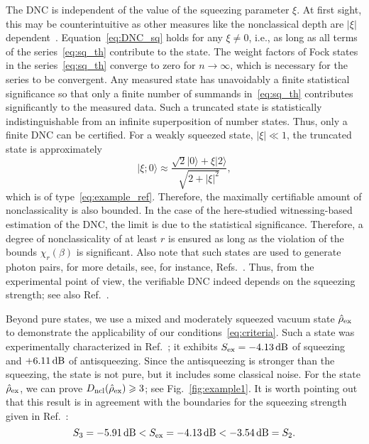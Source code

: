 \documentclass[aps,pra,twocolumn,showpacs,superscriptaddress,10pt]{revtex4-1}
\begin{document}
	The DNC is independent of the value of the squeezing parameter $\xi$.
	At first sight, this may be counterintuitive as other measures like the nonclassical depth are $|\xi|$ dependent~\cite{Lee1991}.
	Equation~\eqref{eq:DNC_sq} holds for any $\xi\neq0$, i.e., as long as all terms of the series~\eqref{eq:sq_th} contribute to the state.
	The weight factors of Fock states in the series~\eqref{eq:sq_th} converge to zero for $n\to\infty$, which is necessary for the series to be convergent.
	Any measured state has unavoidably a finite statistical significance so that only a finite number of summands in~\eqref{eq:sq_th} contributes significantly to the measured data.
	Such a truncated state is statistically indistinguishable from an infinite superposition of number states.
	Thus, only a finite DNC can be certified.
	For a weakly squeezed state, $|\xi|\ll1$, the truncated state is approximately 
	\begin{equation}\label{eq:sq_approx}
		|\xi;0\rangle\approx\frac{\sqrt{2}|0\rangle+\xi|2\rangle}{\sqrt{2+|\xi|^2}},
	\end{equation}
	which is of type~\eqref{eq:example_ref}.
	Therefore, the maximally certifiable amount of nonclassicality is also bounded.
	In the case of the here-studied witnessing-based estimation of the DNC, the limit is due to the statistical significance.
	Therefore, a degree of nonclassicality of at least $r$ is ensured as long as the violation of the bounds $\chi_r(\beta)$ is significant.
	Also note that such states are used to generate photon pairs, for more details, see, for instance, Refs.~\cite{Walmsley2008,Smith2013}.
	Thus, from the experimental point of view, the verifiable DNC indeed depends on the squeezing strength; see also Ref.~\cite{Mraz2014}.

	Beyond pure states, we use a mixed and moderately squeezed vacuum state $\hat{\rho}_{\rm ex}$ to demonstrate the applicability of our conditions~\eqref{eq:criteria}.
	Such a state was experimentally characterized in Ref.~\cite{Ryl2015}; it exhibits $S_{\rm ex}=-4.13\,{\rm dB}$ of squeezing and $+6.11\,{\rm dB}$ of antisqueezing.
	Since the antisqueezing is stronger than the squeezing, the state is not pure, but it includes some classical noise.
	For the state $\hat{\rho}_{\rm ex}$, we can prove $D_{\rm ncl}(\hat{\rho}_{\rm ex})\geqslant3$; see Fig.~\ref{fig:example1}.
	It is worth pointing out that this result is in agreement with the boundaries for the squeezing strength given in Ref.~\cite{Mraz2014}: 
	\begin{equation}
		S_3=-5.91\,{\rm dB}<S_{\rm ex}=-4.13\,{\rm dB}<-3.54\,{\rm dB}=S_2.
	\end{equation}
	
\end{document}
